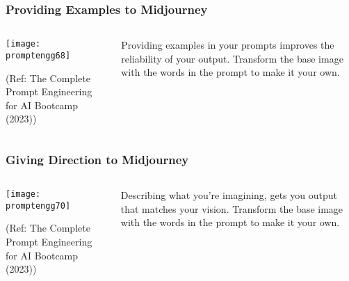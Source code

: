 \begin{frame}[fragile]\frametitle{Providing Examples to Midjourney}


\begin{columns}
    \begin{column}[T]{0.6\linewidth}
		\begin{center}
		\texttt{[image: promptengg68]}

		{\tiny (Ref: The Complete Prompt Engineering for AI Bootcamp (2023))}
		\end{center}	
    \end{column}
    \begin{column}[T]{0.4\linewidth}
		Providing examples in your prompts improves the reliability of your output.
		Transform the base image with the words in the prompt to make it your own.
    \end{column}
  \end{columns}
\end{frame}

\begin{frame}[fragile]\frametitle{Giving Direction to Midjourney}


\begin{columns}
    \begin{column}[T]{0.6\linewidth}
		\begin{center}
		\texttt{[image: promptengg70]}

		{\tiny (Ref: The Complete Prompt Engineering for AI Bootcamp (2023))}
		\end{center}	
    \end{column}
    \begin{column}[T]{0.4\linewidth}
		Describing what you’re imagining, gets you output that matches your vision.
		Transform the base image with the words in the prompt to make it your own.
    \end{column}
  \end{columns}
\end{frame}

